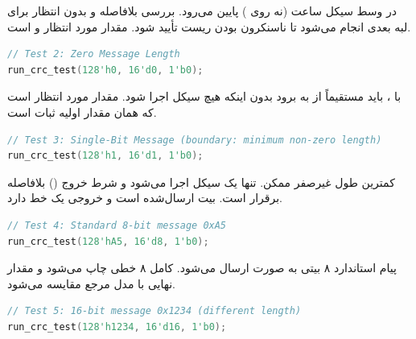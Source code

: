 \vspace{-0.2cm}
 در وسط سیکل ساعت (نه روی ) پایین می‌رود.
بررسی بلافاصله و بدون انتظار برای لبه بعدی انجام می‌شود تا ناسنکرون بودن
ریست تأیید شود. مقدار مورد انتظار  و 
است.

\vspace{0.8cm}
\begin{latin}
    \begin{lstlisting}[language=Verilog]
// Test 2: Zero Message Length
run_crc_test(128'h0, 16'd0, 1'b0);
\end{lstlisting}
\end{latin}

\vspace{-0.2cm}
با ،  باید مستقیماً از  به
 برود بدون اینکه هیچ سیکل  اجرا شود. مقدار مورد انتظار
 است که همان مقدار اولیه ثبات  است.

\vspace{0.8cm}
\begin{latin}
    \begin{lstlisting}[language=Verilog]
// Test 3: Single-Bit Message (boundary: minimum non-zero length)
run_crc_test(128'h1, 16'd1, 1'b0);
\end{lstlisting}
\end{latin}

\vspace{-0.2cm}
کمترین طول غیرصفر ممکن. تنها یک سیکل  اجرا می‌شود و شرط خروج
() بلافاصله برقرار است. بیت ارسال‌شده
 است و  خروجی یک خط دارد.

\vspace{0.8cm}
\begin{latin}
    \begin{lstlisting}[language=Verilog]
// Test 4: Standard 8-bit message 0xA5
run_crc_test(128'hA5, 16'd8, 1'b0);
\end{lstlisting}
\end{latin}

\vspace{-0.2cm}
پیام استاندارد ۸ بیتی  به صورت 
ارسال می‌شود.  کامل ۸ خطی چاپ می‌شود و مقدار نهایی
 با مدل مرجع مقایسه می‌شود.

\vspace{0.8cm}
\begin{latin}
    \begin{lstlisting}[language=Verilog]
// Test 5: 16-bit message 0x1234 (different length)
run_crc_test(128'h1234, 16'd16, 1'b0);
\end{lstlisting}
\end{latin}

